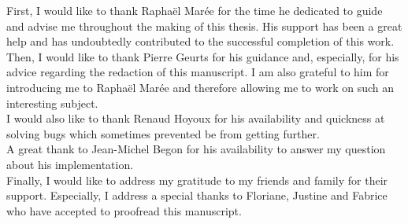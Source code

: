 First, I would like to thank Raphaël Marée for the time he dedicated to guide and advise me throughout the making of this thesis. His support has been a great help and has undoubtedly contributed to the successful completion of this work. 
\\

Then, I would like to thank Pierre Geurts for his guidance and, especially, for his advice regarding the redaction of this manuscript. I am also grateful to him for introducing me to Raphaël Marée and therefore allowing me to work on such an interesting subject. 
\\

I would also like to thank Renaud Hoyoux for his availability and quickness at solving bugs which sometimes prevented be from getting further.
\\

A great thank to Jean-Michel Begon for his availability to answer my question about his implementation. 
\\

Finally, I would like to address my gratitude to my friends and family for their support. Especially, I address a special thanks to Floriane, Justine and Fabrice who have accepted to proofread this manuscript.


